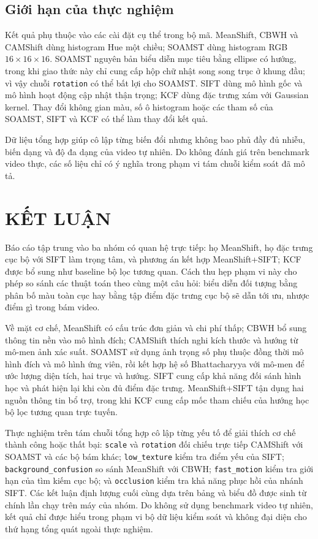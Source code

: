 \documentclass[12pt,a4paper]{article}
\newcommand{\scenario}[1]{\texttt{#1}}
\numberwithin{equation}{section}
\begin{document}
\subsection{Giới hạn của thực nghiệm}

Kết quả phụ thuộc vào các cài đặt cụ thể trong bộ mã. MeanShift, CBWH và CAMShift dùng histogram
Hue một chiều; SOAMST dùng histogram RGB $16\times16\times16$. SOAMST nguyên bản biểu diễn mục
tiêu bằng ellipse có hướng, trong khi giao thức này chỉ cung cấp hộp chữ nhật song song trục ở khung
đầu; vì vậy chuỗi \scenario{rotation} có thể bất lợi cho SOAMST. SIFT dùng mô hình gốc và mô hình
hoạt động cập nhật thận trọng; KCF dùng đặc trưng xám với Gaussian kernel. Thay đổi không gian màu,
số ô histogram hoặc các tham số của SOAMST, SIFT và KCF có thể làm thay đổi kết quả.

Dữ liệu tổng hợp giúp cô lập từng biến đổi nhưng không bao phủ đầy đủ nhiễu, biến dạng và độ đa
dạng của video tự nhiên. Do không đánh giá trên benchmark video thực, các số liệu chỉ có ý nghĩa
trong phạm vi tám chuỗi kiểm soát đã mô tả.

\section{KẾT LUẬN}

Báo cáo tập trung vào ba nhóm có quan hệ trực tiếp: họ MeanShift, họ đặc trưng cục bộ với SIFT
làm trọng tâm, và phương án kết hợp MeanShift+SIFT; KCF được bổ sung như baseline bộ lọc tương
quan. Cách thu hẹp phạm vi này cho phép so sánh các thuật toán theo cùng một câu hỏi: biểu diễn đối
tượng bằng phân bố màu toàn cục hay bằng tập điểm đặc trưng cục bộ sẽ dẫn tới ưu, nhược điểm gì
trong bám video.

Về mặt cơ chế, MeanShift có cấu trúc đơn giản và chi phí thấp; CBWH bổ sung thông tin nền vào mô
hình đích; CAMShift thích nghi kích thước và hướng từ mô-men ảnh xác suất. SOAMST sử dụng ảnh trọng
số phụ thuộc đồng thời mô hình đích và mô hình ứng viên, rồi kết hợp hệ số Bhattacharyya với mô-men
để ước lượng diện tích, hai trục và hướng. SIFT cung cấp khả năng đối sánh hình học và phát hiện lại
khi còn đủ điểm đặc trưng. MeanShift+SIFT tận dụng hai nguồn thông tin bổ trợ, trong khi KCF cung cấp
mốc tham chiếu của hướng học bộ lọc tương quan trực tuyến.

Thực nghiệm trên tám chuỗi tổng hợp cô lập từng yếu tố để giải thích cơ chế thành công hoặc thất
bại: \scenario{scale} và \scenario{rotation} đối chiếu trực tiếp CAMShift với SOAMST và các bộ bám khác; \scenario{low\_texture}
kiểm tra điểm yếu của SIFT; \scenario{background\_confusion} so sánh MeanShift với CBWH;
\scenario{fast\_motion} kiểm tra giới hạn của tìm kiếm cục bộ; và \scenario{occlusion} kiểm tra khả
năng phục hồi của nhánh SIFT. Các kết luận định lượng cuối cùng dựa trên bảng và biểu đồ được sinh
từ chính lần chạy trên máy của nhóm. Do không sử dụng benchmark video tự nhiên, kết quả chỉ được
hiểu trong phạm vi bộ dữ liệu kiểm soát và không đại diện cho thứ hạng tổng quát ngoài thực nghiệm.
\end{document}
